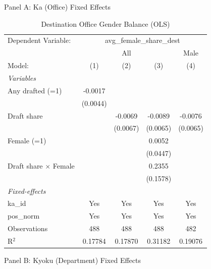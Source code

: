 \begin{table}[htbp]
\centering
\begin{threeparttable}
\caption{Destination Office Gender Balance (OLS)}
\label{tab:dest-gender-balance}
\small
Panel A: Ka (Office) Fixed Effects\\[1ex]
\begingroup
\centering
\begin{tabular}{lcccc}
   \tabularnewline \midrule \midrule
   Dependent Variable: & \multicolumn{4}{c}{avg\_female\_share\_dest}\\
    & \multicolumn{3}{c}{All} & Male \\ 
   Model:                       & (1)      & (2)      & (3)      & (4)\\  
   \midrule
   \emph{Variables}\\
   Any drafted (=1)             & -0.0017  &          &          &   \\   
                                & (0.0044) &          &          &   \\   
   Draft share                  &          & -0.0069  & -0.0089  & -0.0076\\   
                                &          & (0.0067) & (0.0065) & (0.0065)\\   
   Female (=1)                  &          &          & 0.0052   &   \\   
                                &          &          & (0.0447) &   \\   
   Draft share $\times$ Female  &          &          & 0.2355   &   \\   
                                &          &          & (0.1578) &   \\   
   \midrule
   \emph{Fixed-effects}\\
   ka\_id                       & Yes      & Yes      & Yes      & Yes\\  
   pos\_norm                    & Yes      & Yes      & Yes      & Yes\\  
   \midrule
   Observations                 & 488      & 488      & 488      & 482\\  
   R$^2$                        & 0.17784  & 0.17870  & 0.31182  & 0.19076\\  
   \midrule \midrule
\end{tabular}
\par\endgroup
\vspace{2ex}
Panel B: Kyoku (Department) Fixed Effects\\[1ex]

\end{threeparttable}
\end{table}
